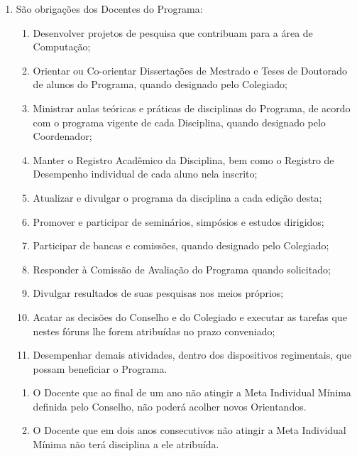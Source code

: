 \documentclass{article}
\newcommand{\grupoMenor}{Colegiado\xspace}
\newcommand{\grupoMaior}{Conselho\xspace}
\begin{document}
\begin{enumerate}
\begin{enumerate}[label=\Roman*]
	\end{enumerate}

	\item São obrigações dos Docentes do Programa:
	\begin{enumerate}[label=\Roman*]
		\item 	Desenvolver projetos de pesquisa que contribuam para a área de Computação;
		\item	Orientar ou Co-orientar Dissertações de Mestrado e Teses de Doutorado de alunos do Programa, quando designado pelo \grupoMenor;
		\item	Ministrar aulas teóricas e práticas de disciplinas do Programa, de acordo com o programa vigente de cada Disciplina, quando designado pelo Coordenador;
		\item	Manter o Registro Acadêmico da Disciplina, bem como o Registro de Desempenho individual de cada aluno nela inscrito;
		\item	Atualizar e divulgar o programa da disciplina a cada edição desta;
		\item	Promover e participar de seminários, simpósios e estudos dirigidos;
		\item	Participar de bancas e comissões, quando designado pelo \grupoMenor;
		\item	Responder à Comissão de Avaliação do Programa quando solicitado;
		\item	Divulgar resultados de suas pesquisas nos meios próprios;
		\item	Acatar as decisões do \grupoMaior e do \grupoMenor e executar as tarefas que nestes fóruns lhe forem atribuídas no prazo conveniado;
		\item	Desempenhar demais atividades, dentro dos dispositivos regimentais, que possam beneficiar o Programa.
	\end{enumerate}

	\begin{enumerate}
		\item O Docente que ao final de um ano não atingir a Meta Individual Mínima definida pelo \grupoMaior, não poderá acolher novos Orientandos.

		\item O Docente que em dois anos consecutivos não atingir a Meta Individual Mínima não terá disciplina a ele atribuída.
	\end{enumerate}
\end{enumerate}
\end{document}
